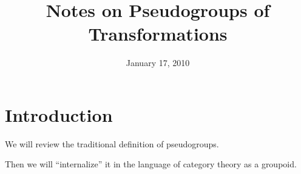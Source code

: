 \documentclass{article}
\title{Notes on Pseudogroups of Transformations}
\date{January 17, 2010}
\theoremstyle{definition}
\begin{document}
\maketitle
\tableofcontents

\section{Introduction}

We will review the traditional definition of pseudogroups.

Then we will ``internalize'' it in the language of category
theory as a groupoid.






\nocite{*}


\end{document}
